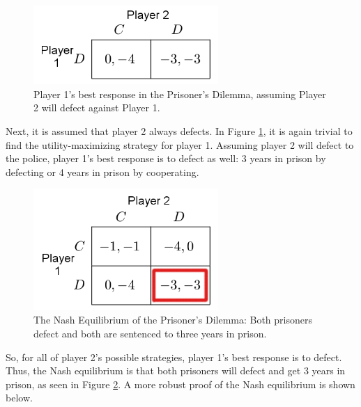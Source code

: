 \begin{figure}[H]
  \centering
  \includegraphics[width=7cm]{figures/ExamplePartialRow2.png}
  \caption{Player 1's best response in the Prisoner's Dilemma, assuming Player 2 will defect against Player 1.}
  \label{fig:NashRow2}
\end{figure}
Next, it is assumed that player 2 always defects. In Figure \ref{fig:NashRow2}, it is again trivial to find the utility-maximizing strategy for player 1. Assuming player 2 will defect to the police, player 1's best response is to defect as well: 3 years in prison by defecting or 4 years in prison by cooperating.\\

\begin{figure}[H]
  \centering
  \includegraphics[width=7cm]{figures/ExampleNashEquilibrium.png}
  \caption{The Nash Equilibrium of the Prisoner's Dilemma: Both prisoners defect and both are sentenced to three years in prison.}
  \label{fig:NashEquil}
\end{figure}

So, for all of player 2's possible strategies, player 1's best response is to defect. Thus, the Nash equilibrium is that both prisoners will defect and get 3 years in prison, as seen in Figure \ref{fig:NashEquil}. A more robust proof of the Nash equilibrium is shown below.



